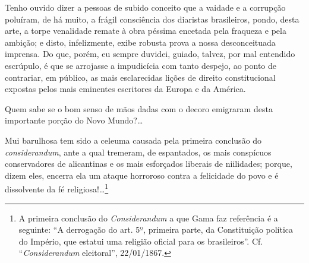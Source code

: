 Tenho ouvido dizer a pessoas de subido conceito que a vaidade e a
corrupção poluíram, de há muito, a frágil consciência dos diaristas
brasileiros, pondo, desta arte, a torpe venalidade remate à obra péssima
encetada pela fraqueza e pela ambição; e disto, infelizmente, exibe
robusta prova a nossa desconceituada imprensa. Do que, porém, eu sempre
duvidei, guiado, talvez, por mal entendido escrúpulo, é que se arrojasse
a impudicícia com tanto despejo, ao ponto de contrariar, em público, as
mais esclarecidas lições de direito constitucional expostas pelos mais
eminentes escritores da Europa e da América.

Quem sabe se o bom senso de mãos dadas com o decoro emigraram desta
importante porção do Novo Mundo?\ldots{}

Mui barulhosa tem sido a celeuma causada pela primeira conclusão do
\textit{considerandum}, ante a qual tremeram, de espantados, os mais conspícuos
conservadores de alicantinas e os mais esforçados liberais de
niilidades; porque, dizem eles, encerra ela um ataque horroroso contra a
felicidade do povo e é dissolvente da fé religiosa!\ldots{}\footnote{A
  primeira conclusão do \emph{Considerandum} a que Gama faz referência é a
  seguinte: ``A derrogação do art. 5º, primeira parte, da Constituição
  política do Império, que estatui uma religião oficial para os
  brasileiros''. Cf. ``\emph{Considerandum} eleitoral'', 22/01/1867.}

